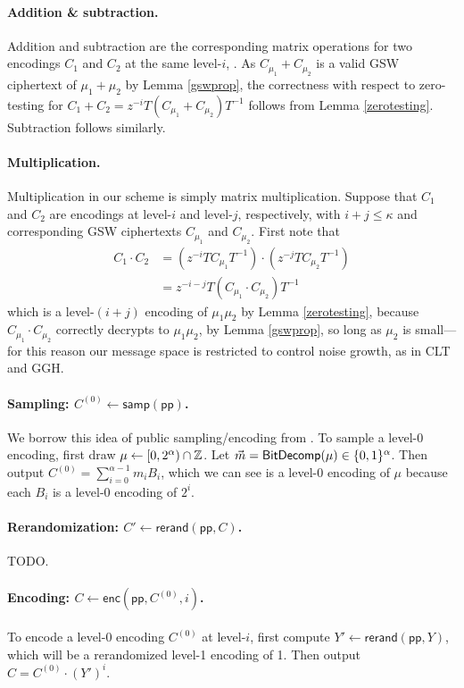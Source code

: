 \paragraph{Addition \& subtraction.}  Addition and subtraction are the corresponding matrix operations for two encodings $C_1$ and $C_2$ at the same level-$i$, . As $C_{\mu_1}+ C_{\mu_2}$ is a valid GSW ciphertext of $\mu_1 + \mu_2$ by Lemma \ref{gswprop}, the correctness with respect to zero-testing for $C_1 + C_2 = z^{-i}T(C_{\mu_1}+C_{\mu_2})T^{-1}$ follows from Lemma \ref{zerotesting}.  Subtraction follows similarly.

\paragraph{Multiplication.}  Multiplication in our scheme is simply matrix multiplication.  Suppose that $C_1$ and $C_2$ are encodings at level-$i$ and level-$j$, respectively, with $i+j \leq \kappa$ and corresponding GSW ciphertexts $C_{\mu_1}$ and $C_{\mu_2}$.  First note that
\begin{align*}
C_1\cdot C_2 &= (z^{-i}TC_{\mu_1}T^{-1})\cdot(z^{-j}TC_{\mu_2}T^{-1})\\
&= z^{-i-j}T(C_{\mu_1}\cdot C_{\mu_2})T^{-1}
\end{align*}
which is a level-$(i+j)$ encoding of $\mu_1\mu_2$ by Lemma \ref{zerotesting}, because $C_{\mu_1} \cdot C_{\mu_2}$ correctly decrypts to $\mu_1\mu_2$, by Lemma \ref{gswprop}, so long as $\mu_2$ is small---for this reason our message space is restricted to control noise growth, as in CLT and GGH.

\paragraph{Sampling:  $C^{(0)} \leftarrow \mathsf{samp}(\mathsf{pp})$.}  We borrow this idea of public sampling/encoding from \cite{bwz}.  To sample a level-0 encoding, first draw $\mu\leftarrow [0,2^\alpha)\cap \mathbb{Z}$.  Let $\vec{m} = \mathsf{BitDecomp}(\mu) \in \{0,1\}^\alpha$.  Then output $C^{(0)} = \sum_{i=0}^{\alpha-1} m_iB_i$, which we can see is a level-0 encoding of $\mu$ because each $B_i$ is a level-0 encoding of $2^i$.

\paragraph{Rerandomization: $C' \leftarrow \mathsf{rerand}(\mathsf{pp}, C)$.}  TODO. 

\paragraph{Encoding:  $C \leftarrow \mathsf{enc}(\mathsf{pp},C^{(0)},i)$.}  To encode a level-0 encoding $C^{(0)}$ at level-$i$, first compute $Y' \leftarrow \mathsf{rerand}(\mathsf{pp}, Y)$, which will be a rerandomized level-1 encoding of 1.  Then output $C = C^{(0)}\cdot \left(Y'\right)^i$.

